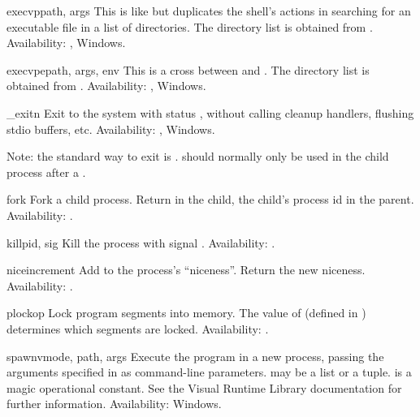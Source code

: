 \begin{funcdesc}{execvp}{path, args}
This is like  but duplicates
the shell's actions in searching for an executable file in a list of
directories.  The directory list is obtained from
.
Availability: \UNIX{}, Windows.
\end{funcdesc}

\begin{funcdesc}{execvpe}{path, args, env}
This is a cross between  and .
The directory list is obtained from .
Availability: \UNIX{}, Windows.
\end{funcdesc}

\begin{funcdesc}{_exit}{n}
Exit to the system with status , without calling cleanup
handlers, flushing stdio buffers, etc.
Availability: \UNIX{}, Windows.

Note: the standard way to exit is .
 should normally only be used in the child process
after a .
\end{funcdesc}

\begin{funcdesc}{fork}{}
Fork a child process.  Return  in the child, the child's
process id in the parent.
Availability: \UNIX{}.
\end{funcdesc}

\begin{funcdesc}{kill}{pid, sig}
Kill the process  with signal .
Availability: \UNIX{}.
\end{funcdesc}

\begin{funcdesc}{nice}{increment}
Add  to the process's ``niceness''.  Return the new
niceness.
Availability: \UNIX{}.
\end{funcdesc}

\begin{funcdesc}{plock}{op}
Lock program segments into memory.  The value of 
(defined in ) determines which segments are locked.
Availability: \UNIX{}.
\end{funcdesc}

\begin{funcdesc}{spawnv}{mode, path, args}
Execute the program  in a new process, passing the arguments 
specified in  as command-line parameters.   may be 
a list or a tuple.   is a magic operational constant.  See
the Visual \Cpp{} Runtime Library documentation for further
information.
Availability: Windows.
\end{funcdesc}

